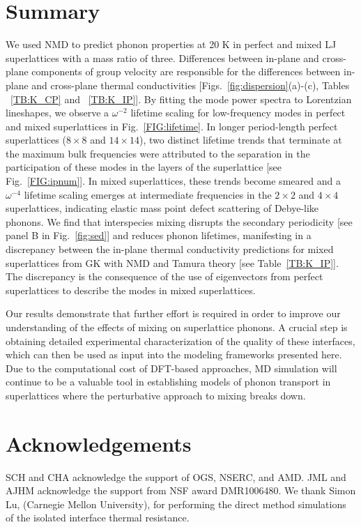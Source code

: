 \documentclass[aps,prb,preprint,preprintnumbers,amsmath,amssymb,floatfix,superscriptaddress]{revtex4}
\begin{document}
\section{Summary}

We used NMD to predict phonon properties at 20 K in perfect and mixed LJ superlattices with a mass ratio of three. Differences between in-plane and cross-plane components of group velocity are responsible for the differences between in-plane and cross-plane thermal conductivities [Figs.~\ref{fig:dispersion}(a)-(c), Tables ~\ref{TB:K_CP} and ~\ref{TB:K_IP}]. By fitting the mode power spectra to Lorentzian lineshapes, we observe a $\omega^{-2}$ lifetime scaling for low-frequency modes in perfect and mixed superlattices in Fig.~\ref{FIG:lifetime}. In longer period-length perfect superlattices ($8 \times 8$ and $14 \times 14$), two distinct lifetime trends that terminate at the maximum bulk frequencies were attributed to the separation in the participation of these modes in the layers of the superlattice [see Fig.~\ref{FIG:ipnum}]. In mixed superlattices, these trends become smeared and a $\omega^{-4}$ lifetime scaling emerges at intermediate frequencies in the $2 \times 2$ and $4 \times 4$ superlattices, indicating elastic mass point defect scattering of Debye-like phonons. We find that interspecies mixing disrupts the secondary periodicity [see panel B in Fig.~\ref{fig:sed}] and reduces phonon lifetimes, manifesting in a discrepancy between the in-plane thermal conductivity predictions for mixed superlattices from GK with NMD and Tamura theory [see Table~\ref{TB:K_IP}]. The discrepancy is the consequence of the use of eigenvectors from perfect superlattices to describe the modes in mixed superlattices.

Our results demonstrate that further effort is required in order to improve our understanding of the effects of mixing on superlattice phonons. A crucial step is obtaining detailed experimental characterization of the quality of these interfaces, which can then be used as input into the modeling frameworks presented here. Due to the computational cost of DFT-based approaches, MD simulation will continue to be a valuable tool in establishing models of phonon transport in superlattices where the perturbative approach to mixing breaks down.

\section{Acknowledgements}
SCH and CHA acknowledge the support of OGS, NSERC, and AMD. JML and AJHM acknowledge the support from NSF award DMR1006480. We thank Simon Lu, (Carnegie Mellon University), for performing the direct method simulations of the isolated interface thermal resistance.
\end{document}
